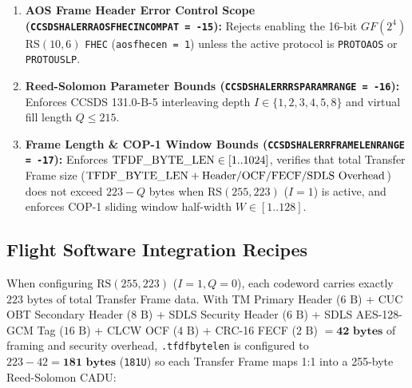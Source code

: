 \documentclass[10pt,a4paper]{article}
\renewcommand{\_}{\origunderscore\penalty0\hskip0pt\relax}
\numberwithin{table}{section}
\numberwithin{figure}{section}
\numberwithin{equation}{section}
\begin{document}
\begin{enumerate}
    \item \textbf{AOS Frame Header Error Control Scope (\texttt{CCSDS\_HAL\_ERR\_AOS\_FHEC\_INCOMPAT = -15}):} Rejects enabling the 16-bit $GF(2^4)$ $\text{RS}(10,6)$ \texttt{FHEC} (\texttt{aos\_fhec\_en = 1}) unless the active protocol is \texttt{PROTO\_AOS} or \texttt{PROTO\_USLP}.
    \item \textbf{Reed-Solomon Parameter Bounds (\texttt{CCSDS\_HAL\_ERR\_RS\_PARAM\_RANGE = -16}):} Enforces CCSDS 131.0-B-5 interleaving depth $I \in \{1, 2, 3, 4, 5, 8\}$ and virtual fill length $Q \le 215$.
    \item \textbf{Frame Length \& COP-1 Window Bounds (\texttt{CCSDS\_HAL\_ERR\_FRAME\_LEN\_RANGE = -17}):} Enforces $\text{TFDF\_BYTE\_LEN} \in [1..1024]$, verifies that total Transfer Frame size ($\text{TFDF\_BYTE\_LEN} + \text{Header/OCF/FECF/SDLS Overhead}$) does not exceed $223 - Q$ bytes when $\text{RS}(255,223)$ ($I=1$) is active, and enforces COP-1 sliding window half-width $W \in [1..128]$.
\end{enumerate}

\subsection{Flight Software Integration Recipes}
When configuring $\text{RS}(255,223)$ ($I=1, Q=0$), each codeword carries exactly $223\text{ bytes}$ of total Transfer Frame data. With TM Primary Header ($6\text{ B}$) + CUC OBT Secondary Header ($8\text{ B}$) + SDLS Security Header ($6\text{ B}$) + SDLS AES-128-GCM Tag ($16\text{ B}$) + CLCW OCF ($4\text{ B}$) + CRC-16 FECF ($2\text{ B}$) $= \mathbf{42\text{ bytes}}$ of framing and security overhead, \texttt{.tfdf\_byte\_len} is configured to $223 - 42 = \mathbf{181\text{ bytes}}$ (\texttt{181U}) so each Transfer Frame maps 1:1 into a 255-byte Reed-Solomon CADU:
\end{document}

